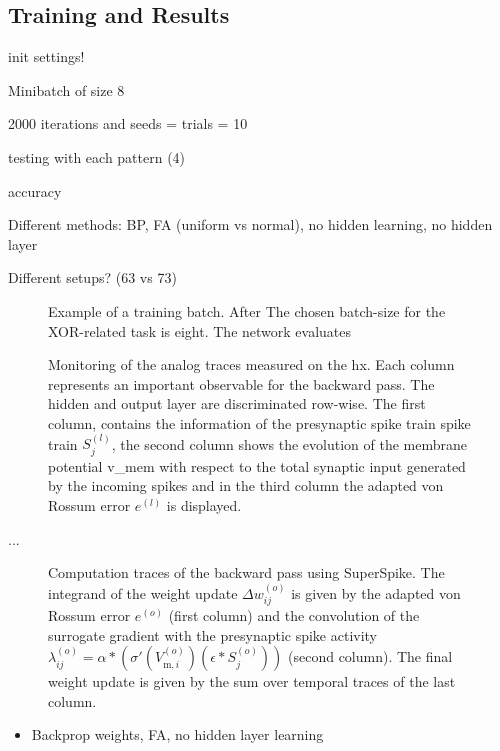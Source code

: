 \subsection{Training and Results}
init settings!

Minibatch of size 8

2000 iterations and seeds = trials = 10

testing with each pattern (4)

accuracy

Different methods: BP, FA (uniform vs normal), no hidden learning, no hidden layer

Different setups? (63 vs 73)


\begin{figure}
	\centering
	
	\caption[Example of a training batch.]{Example of a training batch. After The chosen batch-size for the XOR-related task is eight. The network evaluates}
	\label{inputofabatch}
\end{figure}


\begin{figure}
	\centering
	
	\caption[Monitoring of the analog traces measured on the \gls{hx}.]{Monitoring of the analog traces measured on the \gls{hx}. Each column represents an important observable for the backward pass. The hidden and output layer are discriminated row-wise. The first column, contains the information of the presynaptic spike train spike train $S_j^{(l)}$, the second column shows the evolution of the membrane potential \gls{v_mem} with respect to the total synaptic input generated by the incoming spikes and in the third column the adapted von Rossum error $e^{(l)}$ is displayed.}
	\label{debugplot}
\end{figure}

...
\begin{figure}
	\centering
	
	\caption[Traces in the backward pass using SuperSpike.]{Computation traces of the backward pass using SuperSpike. The integrand of the weight update $\Delta w_{ij}^{(o)}$ is given by the adapted von Rossum error $e^{(o)}$ (first column) and the convolution of the surrogate gradient with the presynaptic spike activity $\lambda_{ij}^{(o)} = \alpha \ast \left(\sigma'(V_{\text{m},i}^{(o)}) \left(\epsilon \ast S_j^{(o)}\right)\right)$ (second column). The final weight update is given by the sum over temporal traces of the last column.}
	\label{weightchangesplot}
\end{figure}


\begin{itemize}
	\item Backprop weights, FA, no hidden layer learning
\end{itemize}